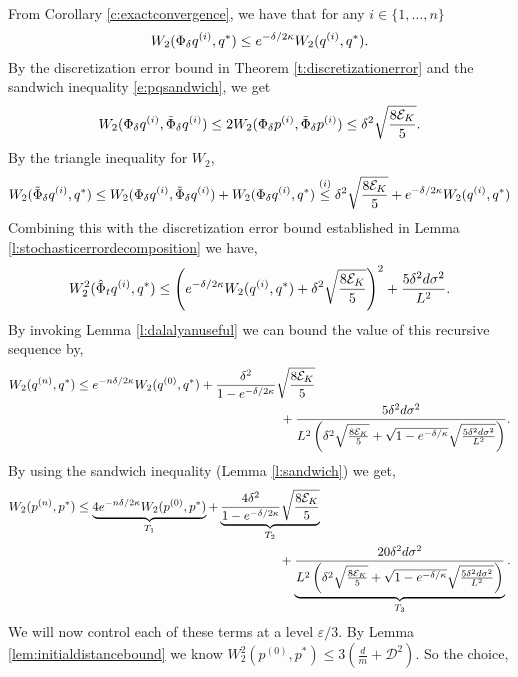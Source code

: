 \begin{Proof} 
From Corollary \ref{c:exactconvergence}, we have that for any $i \in \{1,\ldots,n \}$
$$W_2(\Phi_\delta q^{(i)},q^*)\leq e^{- \delta/2\kappa}W_2(q^{(i)}, q^*).$$
By the discretization error bound in Theorem \ref{t:discretizationerror} and the sandwich inequality \eqref{e:pqsandwich}, we get
$$W_2(\Phi_\delta q^{(i)}, \tilde{\Phi}_\delta q^{(i)})\leq 2W_2(\Phi_\delta p^{(i)}, \tilde{\Phi}_\delta p^{(i)})\leq \delta^2 \sqrt{\frac{8\mathcal{E}_K}{5}}.$$
By the triangle inequality for $W_2$, 
\begin{align*}
W_2(\tilde{\Phi}_\delta q^{(i)}, q^*) & \le W_2(\Phi_\delta q^{(i)}, \tilde{\Phi}_\delta q^{(i)}) + W_2(\Phi_\delta q^{(i)},q^*) \overset{(i)}{\le} \delta^2 \sqrt{\frac{8\mathcal{E}_K}{5}} + e^{-\delta/2\kappa}W_2(q^{(i)}, q^*) \\
\end{align*}
Combining this with the discretization error bound established in Lemma \ref{l:stochasticerrordecomposition} we have,
\begin{align*}
W_2^2(\hat{\Phi}_t q^{(i)},q^*) \le \left(e^{-\delta/2\kappa}W_2(q^{(i)},q^*) + \delta^2 \sqrt{\frac{8\mathcal{E}_K}{5}} \right)^2 + \frac{5\delta^2d\sigma^2}{L^2}.
\end{align*}
By invoking Lemma \ref{l:dalalyanuseful} we can bound the value of this recursive sequence by,
\begin{align*}
W_2(q^{(n)},q^*) & \le e^{-n\delta/2\kappa} W_2(q^{(0)},q^*) + \frac{\delta^2}{1-e^{-\delta/2\kappa}}\sqrt{\frac{8\mathcal{E}_K}{5}} \\ & \qquad \qquad \qquad \qquad \qquad \qquad \qquad \qquad + \frac{5\delta^2d\sigma^2}{L^2\left(\delta^2 \sqrt{\frac{8\mathcal{E}_K}{5}} + \sqrt{1-e^{-\delta/\kappa}}\sqrt{\frac{5\delta^2d\sigma^2}{L^2}}\right)}.
\end{align*}
By using the sandwich inequality (Lemma \ref{l:sandwich}) we get,
\begin{align*}
W_2(p^{(n)},p^*) & \le \underbrace{4e^{-n\delta/2\kappa} W_2(p^{(0)},p^*)}_{T_1} + \underbrace{\frac{4\delta^2}{1-e^{-\delta/2\kappa}}\sqrt{\frac{8\mathcal{E}_K}{5}}}_{T_2} \\ & \qquad \qquad \qquad \qquad \qquad \qquad \qquad \qquad + \underbrace{\frac{20\delta^2d\sigma^2}{L^2\left(\delta^2 \sqrt{\frac{8\mathcal{E}_K}{5}} + \sqrt{1-e^{-\delta/\kappa}}\sqrt{\frac{5\delta^2d\sigma^2}{L^2}}\right)}}_{T_3}.
\end{align*}
We will now control each of these terms at a level $\varepsilon/3$. By Lemma \ref{lem:initialdistancebound} we know $W_2^2(p^{(0)},p^*) \le 3\left( \frac{d}{m} + \mathcal{D}^2 \right)$. So the choice,

\end{Proof}
